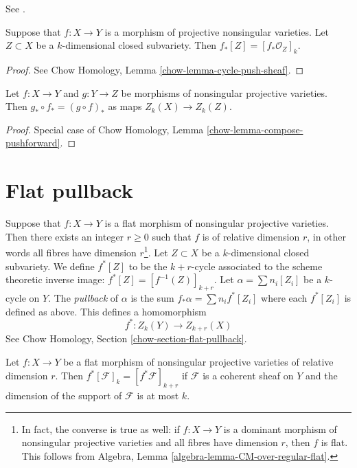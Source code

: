 \begin{lemma}
\label{lemma-push-coherent}
\begin{reference}
See \cite[Chapter V]{Serre_algebre_locale}.
\end{reference}
Suppose that $f : X \to Y$ is a morphism of projective nonsingular varieties.
Let $Z \subset X$ be a $k$-dimensional closed subvariety. Then
$f_*[Z] = [f_*\mathcal{O}_Z]_k$.
\end{lemma}

\begin{proof}
See Chow Homology, Lemma \ref{chow-lemma-cycle-push-sheaf}.
\end{proof}

\begin{lemma}
\label{lemma-compose-pushforward}
Let $f : X \to Y$ and $g : Y \to Z$ be morphisms of nonsingular projective
varieties. Then $g_* \circ f_* = (g \circ f)_*$ as maps $Z_k(X) \to Z_k(Z)$.
\end{lemma}

\begin{proof}
Special case of Chow Homology, Lemma \ref{chow-lemma-compose-pushforward}.
\end{proof}



\section{Flat pullback}
\label{section-flat-pullback}

\noindent
Suppose that $f : X \to Y$ is a flat morphism of nonsingular projective
varieties. Then there exists an integer $r \geq 0$ such that $f$ is of
relative dimension $r$, in other words all fibres have dimension
$r$\footnote{In fact, the converse is true as well: if $f : X \to Y$ is
a dominant morphism of nonsingular projective varieties and all fibres have
dimension $r$, then $f$ is flat. This follows from
Algebra, Lemma \ref{algebra-lemma-CM-over-regular-flat}.}.
Let $Z \subset X$ be a $k$-dimensional closed subvariety. We define
$f^*[Z]$ to be the $k + r$-cycle associated to the scheme theoretic
inverse image: $f^*[Z] = [f^{-1}(Z)]_{k + r}$. Let
$\alpha = \sum n_i [Z_i]$ be a $k$-cycle on $Y$. The {\it pullback} of
$\alpha$ is the sum $f_* \alpha = \sum n_i f^*[Z_i]$ where each $f^*[Z_i]$
is defined as above. This defines a homomorphism
$$
f^* : Z_k(Y) \longrightarrow Z_{k + r}(X)
$$
See Chow Homology, Section \ref{chow-section-flat-pullback}.

\begin{lemma}
\label{lemma-pullback}
Let $f : X \to Y$ be a flat morphism of nonsingular projective varieties
of relative dimension $r$.
Then $f^*[\mathcal{F}]_k = [f^*\mathcal{F}]_{k + r}$
if $\mathcal{F}$ is a coherent sheaf on $Y$ and the dimension of the
support of $\mathcal{F}$ is at most $k$.
\end{lemma}

